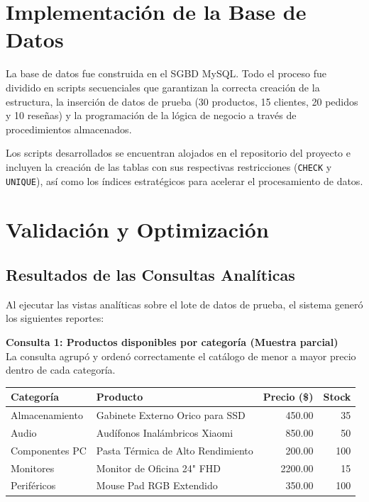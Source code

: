 \documentclass[11pt,a4paper]{article}
\begin{document}
\section{Implementación de la Base de Datos}
La base de datos fue construida en el SGBD MySQL. Todo el proceso fue dividido en scripts secuenciales que garantizan la correcta creación de la estructura, la inserción de datos de prueba (30 productos, 15 clientes, 20 pedidos y 10 reseñas) y la programación de la lógica de negocio a través de procedimientos almacenados.

Los scripts desarrollados se encuentran alojados en el repositorio del proyecto e incluyen la creación de las tablas con sus respectivas restricciones (\texttt{CHECK} y \texttt{UNIQUE}), así como los índices estratégicos para acelerar el procesamiento de datos.

\section{Validación y Optimización}

\subsection{Resultados de las Consultas Analíticas}
Al ejecutar las vistas analíticas sobre el lote de datos de prueba, el sistema generó los siguientes reportes:

\textbf{Consulta 1: Productos disponibles por categoría (Muestra parcial)} \\
La consulta agrupó y ordenó correctamente el catálogo de menor a mayor precio dentro de cada categoría.
\begin{table}[H]
    \centering
    \footnotesize
    \begin{tabular}{@{}llrr@{}}
        \toprule
        \textbf{Categoría} & \textbf{Producto} & \textbf{Precio (\$)} & \textbf{Stock} \\
        \midrule
        Almacenamiento & Gabinete Externo Orico para SSD & 450.00 & 35 \\
        Audio & Audífonos Inalámbricos Xiaomi & 850.00 & 50 \\
        Componentes PC & Pasta Térmica de Alto Rendimiento & 200.00 & 100 \\
        Monitores & Monitor de Oficina 24" FHD & 2200.00 & 15 \\
        Periféricos & Mouse Pad RGB Extendido & 350.00 & 100 \\
        \bottomrule
    \end{tabular}
\end{table}
\end{document}
